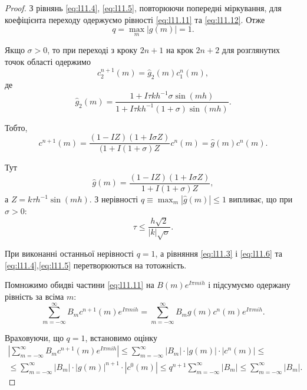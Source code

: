 \begin{proof}
    З рівнянь \eqref{eq:l11.4}, \eqref{eq:l11.5}, повторюючи попередні міркування, для коефіцієнта переходу одержуємо рівності \eqref{eq:l11.11} та \eqref{eq:l11.12}. Отже
    \begin{equation*}
        q = \max_m |g(m)| = 1.
    \end{equation*}

	Якщо $\sigma > 0$, то при переході з кроку $2n+1$ на крок $2n+2$ для розглянутих точок області одержимо
    \begin{equation*}
        c_2^{n+1}(m) = \hat g_2(m)c_1^n(m),
    \end{equation*}
    де\begin{equation*}
        \hat g_2(m) = \frac{1+I\tau kh^{-1}\sigma\sin(mh)}{1+I\tau kh^{-1}(1+\sigma)\sin(mh)}.
    \end{equation*}

    Тобто,
    \begin{equation*}
        c^{n+1}(m) = \frac{(1 - IZ)(1 + I\sigma Z)}{(1 + I(1+\sigma)Z} c^n(m) = \hat g(m) c^n(m).
    \end{equation*}

    Тут
    \begin{equation*}
        \hat g(m) = \frac{(1-IZ)(1+I\sigma Z)}{1 + I(1+\sigma)Z},
    \end{equation*}
    а $Z = k \tau h^{-1} \sin (mh)$. З нерівності $q \equiv \max_m |\hat g(m)| \le 1$ випливає, що при $\sigma > 0$:
    \begin{equation*}
        \tau \le \frac{h \sqrt{2}}{|k| \sqrt{\sigma}}.
    \end{equation*}

	При виконанні останньої нерівності $q = 1$, а рівняння \eqref{eq:l11.3} і \eqref{eq:l11.6} та \eqref{eq:l11.4},\eqref{eq:l11.5} перетворюються на тотожність.  \medskip

	Помножимо обидві частини \eqref{eq:l11.11} на $B(m) e^{I\pi mih}$ і підсумуємо одержану рівність за всіма $m$:
	\begin{equation*}
	    \sum_{m=-\infty}^\infty B_m c^{n+1}(m) e^{I\pi mih} = \sum_{m=-\infty}^\infty B_m g(m) c^n(m) e^{I\pi mih}.
	\end{equation*}

    Враховуючи, що $q = 1$, встановимо оцінку 
    \begin{multline}
	 	\label{eq:l11.13}
        \left| \sum_{m=-\infty}^\infty B_m c^{n+1}(m) e^{I\pi mih} \right| \le \sum_{m=-\infty}^\infty |B_m| \cdot |g(m)| \cdot |c^n(m)| \le \\ \le \sum_{m=-\infty}^\infty |B_m| \cdot |g(m)|^{n + 1} \cdot |c^0(m)| \le q^{n+1} \sum_{m=-\infty}^\infty |B_m| \le \sum_{m=-\infty}^\infty |B_m|.
    \end{multline}


\end{proof}
